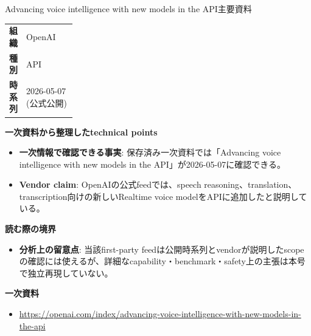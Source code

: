 \begin{technicalnote}{Advancing voice intelligence with new models in the API}{主要資料}
\begingroup
\begin{tabularx}{\linewidth}{@{}>{\bfseries}p{0.22\linewidth}X@{}}
組織 & OpenAI \\
種別 & API \\
時系列 & 2026-05-07 (公式公開) \\
\end{tabularx}
\smallskip
{\bfseries 一次資料から整理したtechnical points}
\begin{itemize}[leftmargin=1.5em,itemsep=0.35em]
\item \textbf{一次情報で確認できる事実}: 保存済み一次資料では「Advancing voice intelligence with new models in the API」が2026-05-07に確認できる。
\item \textbf{Vendor claim}: OpenAIの公式feedでは、speech reasoning、translation、transcription向けの新しいRealtime voice modelをAPIに追加したと説明している。
\end{itemize}
{\bfseries 読む際の境界}
\begin{itemize}[leftmargin=1.5em,itemsep=0.35em]
\item \textbf{分析上の留意点}: 当該first-party feedは公開時系列とvendorが説明したscopeの確認には使えるが、詳細なcapability・benchmark・safety上の主張は本号で独立再現していない。
\end{itemize}
\begin{samepage}
{\bfseries 一次資料}
\begingroup\sloppy
\begin{itemize}[leftmargin=1.5em,itemsep=0.25em]
\item {\scriptsize\url{https://openai.com/index/advancing-voice-intelligence-with-new-models-in-the-api}}
\end{itemize}
\endgroup
\end{samepage}
\endgroup
\end{technicalnote}
\medskip

